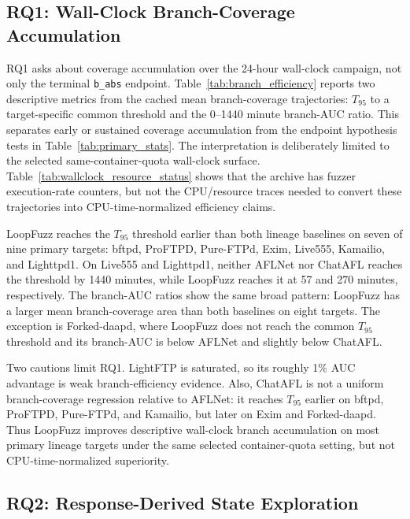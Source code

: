 \documentclass[final,5p,times,number]{elsarticle}
\begin{document}
\subsection{RQ1: Wall-Clock Branch-Coverage Accumulation}
RQ1 asks about coverage accumulation over the 24-hour wall-clock campaign, not only the terminal \texttt{b\_abs} endpoint. Table~\ref{tab:branch_efficiency} reports two descriptive metrics from the cached mean branch-coverage trajectories: $T_{95}$ to a target-specific common threshold and the 0--1440 minute branch-AUC ratio. This separates early or sustained coverage accumulation from the endpoint hypothesis tests in Table~\ref{tab:primary_stats}. The interpretation is deliberately limited to the selected same-container-quota wall-clock surface. Table~\ref{tab:wallclock_resource_status} shows that the archive has fuzzer execution-rate counters, but not the CPU/resource traces needed to convert these trajectories into CPU-time-normalized efficiency claims.

LoopFuzz reaches the $T_{95}$ threshold earlier than both lineage baselines on seven of nine primary targets: bftpd, ProFTPD, Pure-FTPd, Exim, Live555, Kamailio, and Lighttpd1. On Live555 and Lighttpd1, neither AFLNet nor ChatAFL reaches the threshold by 1440 minutes, while LoopFuzz reaches it at 57 and 270 minutes, respectively. The branch-AUC ratios show the same broad pattern: LoopFuzz has a larger mean branch-coverage area than both baselines on eight targets. The exception is Forked-daapd, where LoopFuzz does not reach the common $T_{95}$ threshold and its branch-AUC is below AFLNet and slightly below ChatAFL.

Two cautions limit RQ1. LightFTP is saturated, so its roughly 1\% AUC advantage is weak branch-efficiency evidence. Also, ChatAFL is not a uniform branch-coverage regression relative to AFLNet: it reaches $T_{95}$ earlier on bftpd, ProFTPD, Pure-FTPd, and Kamailio, but later on Exim and Forked-daapd. Thus LoopFuzz improves descriptive wall-clock branch accumulation on most primary lineage targets under the same selected container-quota setting, but not CPU-time-normalized superiority.

\subsection{RQ2: Response-Derived State Exploration}
\end{document}
